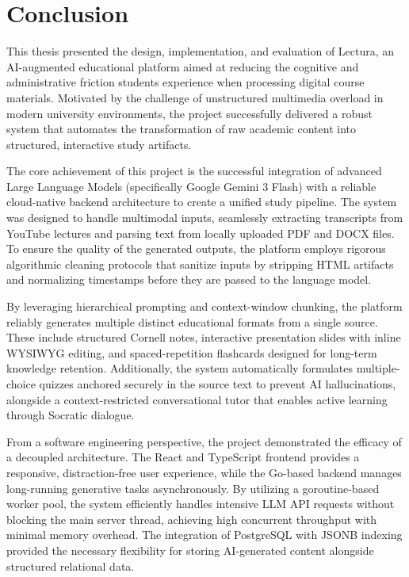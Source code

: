 \chapter*{Conclusion}

This thesis presented the design, implementation, and evaluation of Lectura, an AI-augmented educational platform aimed at reducing the cognitive and administrative friction students experience when processing digital course materials. Motivated by the challenge of unstructured multimedia overload in modern university environments, the project successfully delivered a robust system that automates the transformation of raw academic content into structured, interactive study artifacts.

The core achievement of this project is the successful integration of advanced Large Language Models (specifically Google Gemini 3 Flash) with a reliable cloud-native backend architecture to create a unified study pipeline. The system was designed to handle multimodal inputs, seamlessly extracting transcripts from YouTube lectures and parsing text from locally uploaded PDF and DOCX files. To ensure the quality of the generated outputs, the platform employs rigorous algorithmic cleaning protocols that sanitize inputs by stripping HTML artifacts and normalizing timestamps before they are passed to the language model.

By leveraging hierarchical prompting and context-window chunking, the platform reliably generates multiple distinct educational formats from a single source. These include structured Cornell notes, interactive presentation slides with inline WYSIWYG editing, and spaced-repetition flashcards designed for long-term knowledge retention. Additionally, the system automatically formulates multiple-choice quizzes anchored securely in the source text to prevent AI hallucinations, alongside a context-restricted conversational tutor that enables active learning through Socratic dialogue.

From a software engineering perspective, the project demonstrated the efficacy of a decoupled architecture. The React and TypeScript frontend provides a responsive, distraction-free user experience, while the Go-based backend manages long-running generative tasks asynchronously. By utilizing a goroutine-based worker pool, the system efficiently handles intensive LLM API requests without blocking the main server thread, achieving high concurrent throughput with minimal memory overhead. The integration of PostgreSQL with JSONB indexing provided the necessary flexibility for storing AI-generated content alongside structured relational data.

